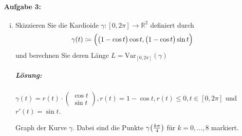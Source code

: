 \documentclass{scrreprt}
\begin{document}
\paragraph{Aufgabe 3:}
\begin{enumerate}[(i)]
\item Skizzieren Sie die Kardioide $\gamma \colon [0, 2\pi] \to \mathbb{R}^2$
  definiert durch
  \[
    \gamma(t) \coloneqq \qty\Big(\qty\big(1 - \cos t)\cos t, \qty\big(1 - \cos t) \sin t)
  \]
  und berechnen Sie deren Länge $L = \text{Var}_{[0, 2\pi]}(\gamma)$

  \subparagraph{Lösung:} $\gamma(t) = r(t) \cdot \begin{pmatrix}
    \cos t \\
    \sin t
  \end{pmatrix}, r(t) = 1 - \cos t, r(t) \leq 0, t \in [0, 2\pi]$
  und $r'(t) = \sin t$.
  \newpage
  \begin{center}
  \end{center}
  Graph der Kurve $\gamma$. Dabei sind die Punkte
  $\gamma\qty(\frac{k\pi}{4})$ für $k = 0, \ldots, 8$ markiert.


\end{enumerate}
\end{document}
